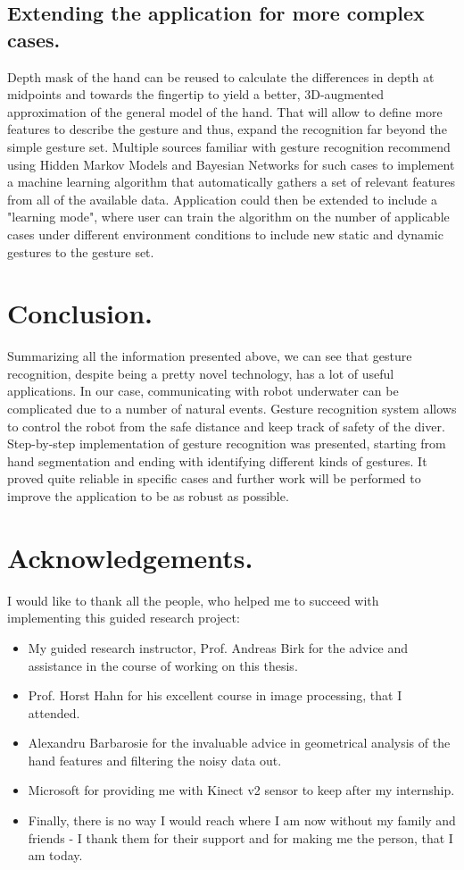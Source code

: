 \documentclass[a4paper,11pt,oneside]{article}
\begin{document}
\subsection{Extending the application for more complex cases.}

Depth mask of the hand can be reused to calculate the differences in depth at midpoints and towards the fingertip to yield a better, 3D-augmented approximation of the general model of the hand. That will allow to define more features to describe the gesture and thus, expand the recognition far beyond the simple gesture set. Multiple sources familiar with gesture recognition recommend using Hidden Markov Models and Bayesian Networks \cite{ZG01} for such cases to implement a machine learning algorithm that automatically gathers a set of relevant features from all of the available data. Application could then be extended to include a "learning mode", where user can train the algorithm on the number of applicable cases under different environment conditions to include new static and dynamic gestures to the gesture set.

\section{Conclusion.}

Summarizing all the information presented above, we can see that gesture recognition, despite being a pretty novel technology, has a lot of useful applications. In our case, communicating with robot underwater can be complicated due to a number of natural events. Gesture recognition system allows to control the robot from the safe distance and keep track of safety of the diver. Step-by-step implementation of gesture recognition was presented, starting from hand segmentation and ending with identifying different kinds of gestures. It proved quite reliable in specific cases and further work will be performed to improve the application to be as robust as possible.  

\newpage
\section{Acknowledgements.}
I would like to thank all the people, who helped me to succeed with implementing this guided research project:

\begin{itemize}
\item My guided research instructor, Prof. Andreas Birk for the advice and assistance in the course of working on this thesis.
\item Prof. Horst Hahn for his excellent course in image processing, that I attended.
\item Alexandru Barbarosie for the invaluable advice in geometrical analysis of the hand features and filtering the noisy data out. 
\item Microsoft for providing me with Kinect v2 sensor to keep after my internship. 
\item Finally, there is no way I would reach where I am now without my family and friends - I thank them for their support and for making me the person, that I am today.
\end{itemize}
\end{document}
